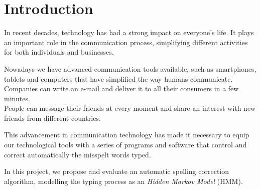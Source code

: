 \chapter{Introduction}
\label{chap:Introduction}

In recent decades, technology has had a strong impact on everyone's life. It plays an important role in the 
communication process, simplifying different activities for both individuals and businesses.

Nowadays we have advanced communication tools available, such as smartphones, tablets and computers that have 
simplified the way humans communicate. \\
Companies can write an e-mail and deliver it to all their consumers in a few minutes. \\
People can message their friends at every moment and share an interest with new friends from different countries.

This advancement in communication technology has made it necessary to equip our technological tools with a series of 
programs and software that control and correct automatically the misspelt words typed.

In this project, we propose and evaluate an automatic spelling correction algorithm, modelling the typing process as an 
\textit{Hidden Markov Model} (HMM). 
